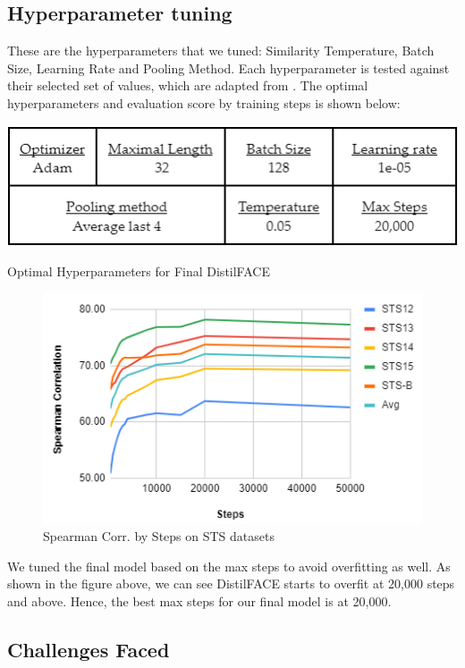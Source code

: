 \documentclass[10pt,twocolumn,letterpaper]{article}
\begin{document}
\subsection{Hyperparameter tuning}

These are the hyperparameters that we tuned: Similarity Temperature, Batch Size, Learning Rate and Pooling Method. Each hyperparameter is tested against their selected set of values, which are adapted from \cite{2104.08821}. The optimal hyperparameters and evaluation score by training steps is shown below:

\begin{table}[hbt!]
\centering
\includegraphics[scale=0.60]{images/Optimal-Hyperparameters.png}
\caption{Optimal Hyperparameters for Final DistilFACE}
\label{fig:short}
\end{table}

\begin{figure}[hbt!]
\centering
\includegraphics[scale=0.70]{images/Results-Evaluation-Score-by-Steps.png}
\caption{Spearman Corr. by Steps on STS datasets}
\label{fig:short}
\end{figure}

We tuned the final model based on the max steps to avoid overfitting as well. As shown in the figure above, we can see DistilFACE starts to overfit at 20,000 steps and above. Hence, the best max steps for our final model is at 20,000.

\subsection{Challenges Faced}
\end{document}
